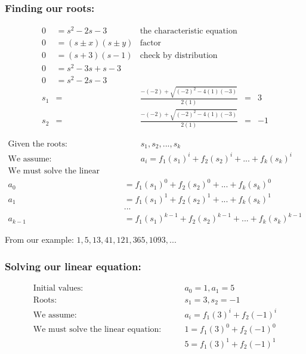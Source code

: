 \documentclass{article}
\begin{document}
\subsubsection{Finding our roots:}
\begin{align*}
0 &= s^2 - 2s - 3 & \text{the characteristic equation} \\
0 &= (s \pm x)(s \pm y) & \text{factor} \\
0 &= (s + 3)(s - 1) & \text{check by distribution} \\
0 &= s^2 - 3s + s - 3  & \\
0 &= s^2 - 2s - 3 & \\
s_1 &=& \frac{-(-2)+\sqrt{(-2)^2-4(1)(-3)}}{2(1)} &=& 3 \\
s_2 &=& \frac{-(-2)+\sqrt{(-2)^2-4(1)(-3)}}{2(1)} &=& -1
\end{align*}

\begin{align*}
\text{Given the roots:} & \qquad s_1,s_2,...,s_k \\
\text{We assume:} & \qquad a_i = f_1(s_1)^i + f_2(s_2)^i + ... + f_k(s_k)^i \\
\text{We must solve the linear equation system:}  & \qquad \\
a_0 & = f_1(s_1)^0 + f_2(s_2)^0 + ... + f_k(s_k)^0 \\ 
a_1 & = f_1(s_1)^1 + f_2(s_2)^1 + ... + f_k(s_k)^1 \\ 
& ... \\
a_{k-1} & = f_1(s_1)^{k-1} + f_2(s_2)^{k-1} + ... + f_k(s_k)^{k-1}
\end{align*}

From our example: $1, 5, 13, 41, 121, 365, 1093, ...$


\subsubsection{Solving our linear equation:}
\begin{align*}
\text{Initial values:} & \qquad a_0 = 1, a_1 = 5 \\
\text{Roots:} & \qquad s_1 = 3, s_2 = -1 \\
\text{We assume:} & \qquad a_i=f_1(3)^i + f_2(-1)^i \\ 
\text{We must solve the linear equation:} & \qquad 1 = f_1(3)^0 + f_2(-1)^0 \\
& \qquad 5 = f_1(3)^1 + f_2(-1)^1 \\
\end{align*}
\end{document}
